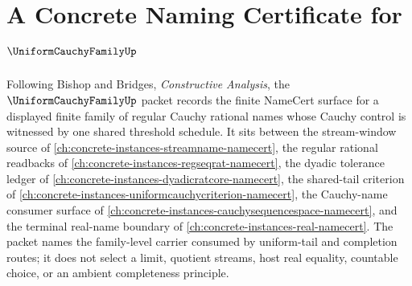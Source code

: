 \chapter{A Concrete Naming Certificate for $\UniformCauchyFamilyUp$}
\label{ch:concrete-instances-uniform-cauchy-family-namecert}

Following Bishop and Bridges, \emph{Constructive Analysis}, the $\UniformCauchyFamilyUp$ packet records the finite NameCert surface for a displayed finite family of regular Cauchy rational names whose Cauchy control is witnessed by one shared threshold schedule. It sits between the stream-window source of \autoref{ch:concrete-instances-streamname-namecert}, the regular rational readbacks of \autoref{ch:concrete-instances-regseqrat-namecert}, the dyadic tolerance ledger of \autoref{ch:concrete-instances-dyadicratcore-namecert}, the shared-tail criterion of \autoref{ch:concrete-instances-uniformcauchycriterion-namecert}, the Cauchy-name consumer surface of \autoref{ch:concrete-instances-cauchysequencespace-namecert}, and the terminal real-name boundary of \autoref{ch:concrete-instances-real-namecert}. The packet names the family-level carrier consumed by uniform-tail and completion routes; it does not select a limit, quotient streams, host real equality, countable choice, or an ambient completeness principle.

